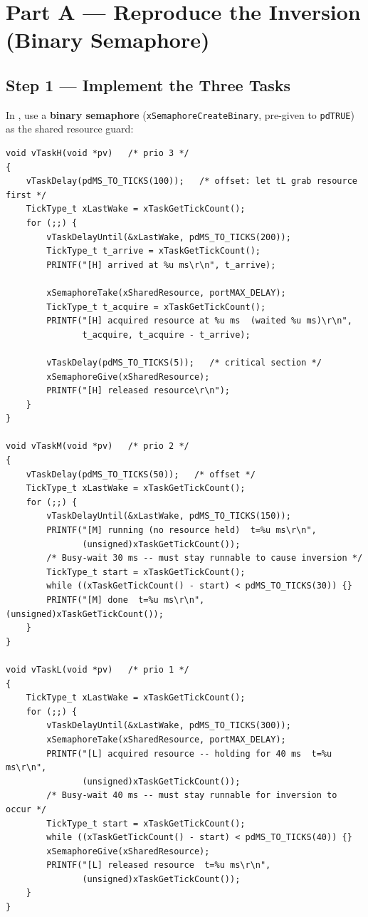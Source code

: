 \documentclass[11pt, a4paper]{article}
\begin{document}
\section{Part A --- Reproduce the Inversion (Binary Semaphore)}

\subsection{Step 1 --- Implement the Three Tasks}

In , use a \textbf{binary semaphore}
(\texttt{xSemaphoreCreateBinary}, pre-given to \texttt{pdTRUE}) as the shared resource
guard:

\begin{lstlisting}[style=cstyle]
void vTaskH(void *pv)   /* prio 3 */
{
    vTaskDelay(pdMS_TO_TICKS(100));   /* offset: let tL grab resource first */
    TickType_t xLastWake = xTaskGetTickCount();
    for (;;) {
        vTaskDelayUntil(&xLastWake, pdMS_TO_TICKS(200));
        TickType_t t_arrive = xTaskGetTickCount();
        PRINTF("[H] arrived at %u ms\r\n", t_arrive);

        xSemaphoreTake(xSharedResource, portMAX_DELAY);
        TickType_t t_acquire = xTaskGetTickCount();
        PRINTF("[H] acquired resource at %u ms  (waited %u ms)\r\n",
               t_acquire, t_acquire - t_arrive);

        vTaskDelay(pdMS_TO_TICKS(5));   /* critical section */
        xSemaphoreGive(xSharedResource);
        PRINTF("[H] released resource\r\n");
    }
}

void vTaskM(void *pv)   /* prio 2 */
{
    vTaskDelay(pdMS_TO_TICKS(50));   /* offset */
    TickType_t xLastWake = xTaskGetTickCount();
    for (;;) {
        vTaskDelayUntil(&xLastWake, pdMS_TO_TICKS(150));
        PRINTF("[M] running (no resource held)  t=%u ms\r\n",
               (unsigned)xTaskGetTickCount());
        /* Busy-wait 30 ms -- must stay runnable to cause inversion */
        TickType_t start = xTaskGetTickCount();
        while ((xTaskGetTickCount() - start) < pdMS_TO_TICKS(30)) {}
        PRINTF("[M] done  t=%u ms\r\n", (unsigned)xTaskGetTickCount());
    }
}

void vTaskL(void *pv)   /* prio 1 */
{
    TickType_t xLastWake = xTaskGetTickCount();
    for (;;) {
        vTaskDelayUntil(&xLastWake, pdMS_TO_TICKS(300));
        xSemaphoreTake(xSharedResource, portMAX_DELAY);
        PRINTF("[L] acquired resource -- holding for 40 ms  t=%u ms\r\n",
               (unsigned)xTaskGetTickCount());
        /* Busy-wait 40 ms -- must stay runnable for inversion to occur */
        TickType_t start = xTaskGetTickCount();
        while ((xTaskGetTickCount() - start) < pdMS_TO_TICKS(40)) {}
        xSemaphoreGive(xSharedResource);
        PRINTF("[L] released resource  t=%u ms\r\n",
               (unsigned)xTaskGetTickCount());
    }
}
\end{lstlisting}
\end{document}
